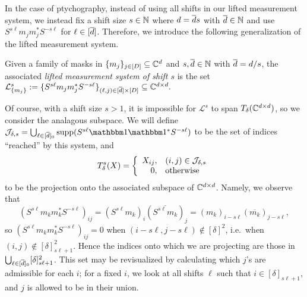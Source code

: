 In the case of ptychography, instead of using all shifts in our lifted measurement system, we instead fix a shift size $s \in \mathbb{N}$ where $d = \overline{d} s$ with $\overline{d} \in \mathbb{N}$ and use $S^{s \ell} m_j m_j^* S^{-s \ell}$ for $\ell \in [\overline{d}]$.  Therefore, we introduce the following generalization of the lifted measurement system.

\begin{definition}
  Given a family of masks in $\{m_j\}_{j \in [D]} \subseteq \mathbb{C}^d$ and $s, \overline{d} \in \mathbb{N}$ with $\overline{d} = d / s$, the associated \emph{lifted measurement system of shift $s$} is the set $\mathcal{L}_{\{m_j\}}^s := \{S^{s \ell} m_j m_j^* S^{-s \ell}\}_{(\ell, j) \in [\overline{d}] \times [D]} \subseteq \mathbb{C}^{d \times d}.$
\end{definition}

Of course, with a shift size $s > 1$, it is impossible for $\mathcal{L}^s$ to span $T_\delta(\mathbb{C}^{d \times d})$, so we consider the analagous subspace.  We will define $\mathcal{J}_{\delta, s} = \bigcup_{\ell \in [\dbar]_0}\supp(S^{s \ell} \one \one^* S^{-s \ell})$ to be the set of indices ``reached'' by this system, and \[T_\delta^s(X) = \left\{\begin{array}{r@{,\quad}l} X_{ij} & (i, j) \in \mathcal{J}_{\delta, s} \\ 0 & \text{otherwise}\end{array}\right.\] to be the projection onto the associated subspace of $\mathbb{C}^{d \times d}$.  Namely, we observe that \[\left(S^{s \ell} m_k m_k^* S^{-s \ell}\right)_{ij} = (S^{s \ell} m_k)_i (\overline{S^{s \ell} m_k})_j = (m_k)_{i - s \ell} (\overline{m_k})_{j - s\ell},\] so $\left(S^{s \ell} m_k m_k^* S^{-s \ell}\right)_{ij} = 0$ when $(i - s \ell, j - s \ell) \notin [\delta]^2$, i.e.~when $(i, j) \notin [\delta]^2_{s \ell + 1}$.  Hence the indices onto which we are projecting are those in $\bigcup_{\ell \in [\overline{d}]_0} [\delta]_{s \ell + 1}^2$.  This set may be revisualized by calculating which $j$'s are admissible for each $i$; for a fixed $i$, we look at all shifts $\ell$ such that $i \in [\delta]_{s\ell + 1}$, and $j$ is allowed to be in their union.  

